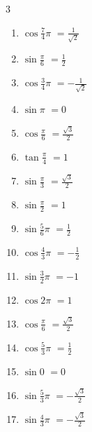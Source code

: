 \begin{multicols}{3}
\begin{enumerate}
  \item $\displaystyle \cos{\frac{7}{4}\pi}$
        $\displaystyle =\frac{1}{\sqrt{2}}$

  \item $\displaystyle \sin{\frac{\pi}{6}}$
        $\displaystyle =\frac{1}{2}$

  \item $\displaystyle \cos{\frac{3}{4}\pi}$
        $\displaystyle =-\frac{1}{\sqrt{2}}$

  \item $\displaystyle \sin{\pi}$
        $\displaystyle =0$

  \item $\displaystyle \cos{\frac{\pi}{6}}$
        $\displaystyle =\frac{\sqrt{3}}{2}$

  \item $\displaystyle \tan{\frac{\pi}{4}}$
        $\displaystyle =1$

  \item $\displaystyle \sin{\frac{\pi}{3}}$
        $\displaystyle =\frac{\sqrt{3}}{2}$

  \item $\displaystyle \sin{\frac{\pi}{2}}$
        $\displaystyle =1$

  \item $\displaystyle \sin{\frac{5}{6}\pi}$
        $\displaystyle =\frac{1}{2}$

  \item $\displaystyle \cos{\frac{4}{3}\pi}$
        $\displaystyle =-\frac{1}{2}$

  \item $\displaystyle \sin{\frac{3}{2}\pi}$
        $\displaystyle =-1$

  \item $\displaystyle \cos{2\pi}$
        $\displaystyle =1$

  \item $\displaystyle \cos{\frac{\pi}{6}}$
        $\displaystyle =\frac{\sqrt{3}}{2}$

  \item $\displaystyle \cos{\frac{5}{3}\pi}$
        $\displaystyle =\frac{1}{2}$

  \item $\displaystyle \sin{0}$
        $\displaystyle =0$

  \item $\displaystyle \sin{\frac{5}{3}\pi}$
        $\displaystyle =-\frac{\sqrt{3}}{2}$

  \item $\displaystyle \sin{\frac{4}{3}\pi}$
        $\displaystyle =-\frac{\sqrt{3}}{2}$


\end{enumerate}
\end{multicols}
